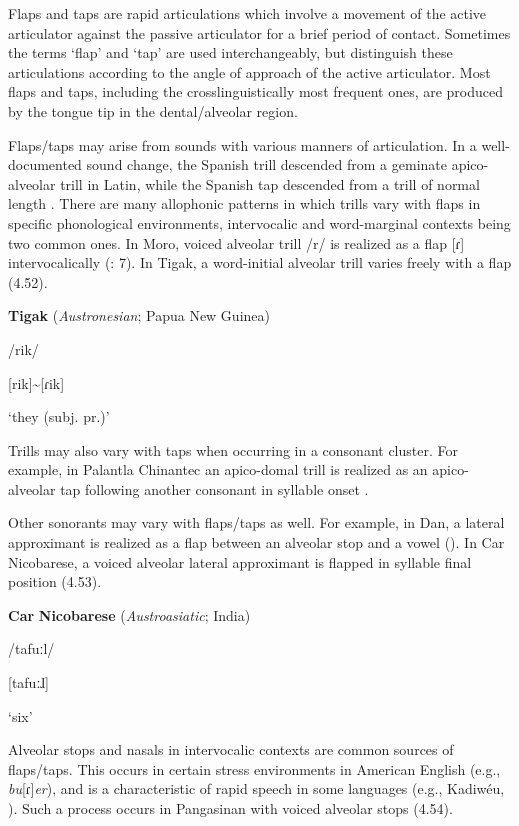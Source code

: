   Flaps and taps are rapid articulations which involve a movement of the active articulator against the passive articulator for a brief period of contact. Sometimes the terms ‘flap’ and ‘tap’ are used interchangeably, but \citet{LadefogedMaddieson1996} distinguish these articulations according to the angle of approach of the active articulator. Most flaps and taps, including the crosslinguistically most frequent ones, are produced by the tongue tip in the dental/alveolar region.

  Flaps/taps may arise from sounds with various manners of articulation. In a well-documented sound change, the Spanish trill descended from a geminate apico-alveolar trill in Latin, while the Spanish tap descended from a trill of normal length \citep[17-18]{Hualde2004}. There are many allophonic patterns in which trills vary with flaps in specific phonological environments, intervocalic and word-marginal contexts being two common ones. In Moro, voiced alveolar trill /r/ is realized as a flap [ɾ] intervocalically (\citealt{BlackBlack1971}: 7). In Tigak, a word-initial alveolar trill varies freely with a flap (4.52).

\ea\label{ex:(4.52)}
  \textbf{Tigak} (\textit{Austronesian}; Papua New Guinea)

/rik/

[rik]{\textasciitilde}[ɾik]

‘they (subj. pr.)’

\citep[14]{Beaumont1979}

\z

Trills may also vary with taps when occurring in a consonant cluster. For example, in Palantla Chinantec an apico-domal trill is realized as an apico-alveolar tap following another consonant in syllable onset \citep[3]{Merrifield1963}. 

  Other sonorants may vary with flaps/taps as well. For example, in Dan, a lateral approximant is realized as a flap between an alveolar stop and a vowel (\citealt{BearthZemp1967}). In Car Nicobarese, a voiced alveolar lateral approximant is flapped in syllable final position (4.53).

\ea\label{ex:(4.53)}
  \textbf{Car} \textbf{Nicobarese} (\textit{Austroasiatic}; India)

/tafuːl/

[tafuːɺ]

‘six’

\citep[45]{Braine1970}

\z

  Alveolar stops and nasals in intervocalic contexts are common sources of flaps/taps. This occurs in certain stress environments in American English (e.g., \textit{bu}[ɾ]\textit{er}), and is a characteristic of rapid speech in some languages (e.g., Kadiwéu, \citealt{Sandalo1997}). Such a process occurs in Pangasinan with voiced alveolar stops (4.54).

